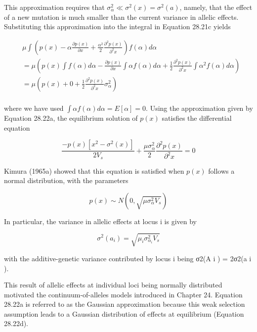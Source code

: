 \documentclass{article}
\begin{document}
This approximation requires that  $ \sigma_\alpha^2 \ll \sigma^2(x) = \sigma^2(a) $, namely, that the effect of a new mutation is much smaller than the current variance in allelic effects. Substituting this approximation into the integral in Equation 28.21c yields

\begin{equation}
\begin{aligned}&\mu\int\left(p(x)-\alpha\frac{\partial p(x)}{\partial x}+\frac{\alpha^{2}}{2}\frac{\partial^{2}p(x)}{\partial^{2}x}\right)f(\alpha)d\alpha\\&=\mu\left(p(x)\int f(\alpha)d\alpha-\frac{\partial p(x)}{\partial x}\int\alpha f(\alpha)d\alpha+\frac{1}{2}\frac{\partial^{2}p(x)}{\partial^{2}x}\int\alpha^{2}f(\alpha)d\alpha\right)\\&=\mu\left(p(x)+0+\frac{1}{2}\frac{\partial^{2}p(x)}{\partial^{2}x}\sigma_{\alpha}^{2}\right)\\ \end{aligned}
\tag{28.22b}
\label{eq:28_22b}
\end{equation}

where we have used  $ \int \alpha f(\alpha) d\alpha = E[\alpha] = 0 $. Using the approximation given by Equation 28.22a, the equilibrium solution of  $ p(x) $ satisfies the differential equation

\begin{equation}
\frac{-p(x)[x^{2}-\sigma^{2}(x)]}{2V_{s}}+\frac{\mu\sigma_{\alpha}^{2}}{2}\frac{\partial^{2}p(x)}{\partial^{2}x}=0
\tag{28.22c}
\label{eq:28_22c}
\end{equation}

Kimura (1965a) showed that this equation is satisfied when  $ p(x) $ follows a normal distribution, with the parameters

\begin{equation}
p(x)\sim N\left(0,\sqrt{\mu\sigma_{\alpha}^{2}V_{s}}\right)
\tag{28.22d}
\label{eq:28_22d}
\end{equation}

In particular, the variance in allelic effects at locus i is given by

\begin{equation}
\sigma^{2}(a_{i})=\sqrt{\mu_{i}\sigma_{\alpha_{i}}^{2}V_{s}}
\tag{28.22e}
\label{eq:28_22e}
\end{equation}

with the additive-genetic variance contributed by locus i being σ2(A i ) = 2σ2(a i ).

This result of allelic effects at individual loci being normally distributed motivated the continuum-of-alleles models introduced in Chapter 24. Equation 28.22a is referred to as the Gaussian approximation because this weak selection assumption leads to a Gaussian distribution of effects at equilibrium (Equation 28.22d).
\end{document}
